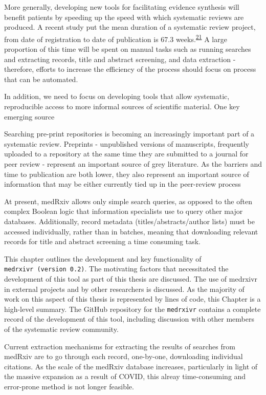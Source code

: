 \documentclass[a4paper, twoside]{templates/ociamthesis}
\begin{document}
More generally, developing new tools for facilitating evidence synthesis will benefit patients by speeding up the speed with which systematic reviews are produced. A recent study put the mean duration of a systematic review project, from date of registration to date of publication is 67.3 weeks.\textsuperscript{\protect\hyperlink{ref-borah2017}{21}} A large proportion of this time will be spent on manual tasks such as running searches and extracting records, title and abstract screening, and data extraction - therefore, efforts to increase the efficiency of the process should focus on process that can be automated.

In addition, we need to focus on developing tools that allow systematic, reproducible access to more informal sources of scientific material. One key emerging source

Searching pre-print repositories is becoming an increasingly important part of a systematic review. Preprints - unpublished versions of manuscripts, frequently uploaded to a repository at the same time they are submitted to a journal for peer review - represent an important source of grey literature. As the barriers and time to publication are both lower, they also represent an important source of information that may be either currently tied up in the peer-review process

At present, medRxiv allows only simple search queries, as opposed to the often complex Boolean logic that information specialists use to query other major databases. Additionally, record metadata (titles/abstracts/author lists) must be accessed individually, rather than in batches, meaning that downloading relevant records for title and abstract screening a time consuming task.

This chapter outlines the development and key functionality of \texttt{medrxivr\ (version\ 0.2)}. The motivating factors that necessitated the development of this tool as part of this thesis are discussed. The use of medrxivr in external projects and by other researchers is discussed. As the majority of work on this aspect of this thesis is represented by lines of code, this Chapter is a high-level summary. The GitHub repository for the \texttt{medrxivr} contains a complete record of the development of this tool, including discussion with other members of the systematic review community.

Current extraction mechanisms for extracting the results of searches from medRxiv are to go through each record, one-by-one, downloading individual citations. As the scale of the medRxiv database increases, particularly in light of the massive expansion as a result of COVID, this alreay time-consuming and error-prone method is not longer feasible.
\end{document}

